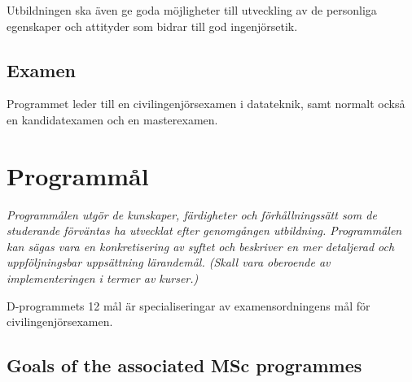 \documentclass[twocolumn]{article}
\newcommand{\meta}[1]{{\small \emph{#1}}}
\begin{document}
Utbildningen ska även ge goda möjligheter till utveckling av de
personliga egenskaper och attityder som bidrar till god ingenjörsetik.

\subsection{Examen}

Programmet leder till en civilingenjörsexamen i datateknik, samt
normalt också en kandidatexamen och en masterexamen.

\section{Programmål}
\meta{Programmålen utgör de kunskaper, färdigheter och
  förhållningssätt som de studerande förväntas ha utvecklat efter
  genomgången utbildning. Programmålen kan sägas vara en
  konkretisering av syftet och beskriver en mer detaljerad och
  uppföljningsbar uppsättning lärandemål. (Skall vara oberoende av
  implementeringen i termer av kurser.)}

D-programmets 12 mål är specialiseringar av examensordningens mål för
civilingenjörsexamen.




\subsection{Goals of the associated MSc programmes}
\end{document}
